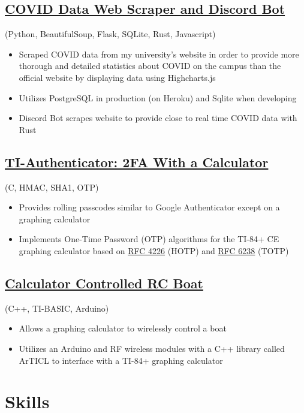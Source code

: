 \documentclass{article}
\begin{document}
\subsection{\href{https://github.com/jshin313/unofficial-temple-covid-live-dashboard}{COVID Data Web Scraper and Discord Bot}} (Python, BeautifulSoup, Flask, SQLite, Rust, Javascript)
\begin{itemize}
    \item Scraped COVID data from my university's website in order to provide more thorough and detailed statistics about COVID on the campus than the official website by displaying data using Highcharts.js
    \item Utilizes PostgreSQL in production (on Heroku) and Sqlite when developing
    \item Discord Bot scrapes website to provide close to real time COVID data with Rust
\end{itemize}

\subsection{\href{https://github.com/jshin313/ti-authenticator}{TI-Authenticator: 2FA With a Calculator}} (C, HMAC, SHA1, OTP)
\begin{itemize}
    \item Provides rolling passcodes similar to Google Authenticator except on a graphing calculator
    \item Implements One-Time Password (OTP) algorithms for the TI-84+ CE graphing calculator based on \href{https://tools.ietf.org/html/rfc4226}{RFC 4226} (HOTP) and \href{https://tools.ietf.org/html/rfc6238}{RFC 6238} (TOTP)
\end{itemize}

\subsection{\href{https://github.com/jshin313/CalcControlledBoat}{Calculator Controlled RC Boat}} (C++, TI-BASIC, Arduino)
\begin{itemize}
    \item Allows a graphing calculator to wirelessly control a boat
    \item Utilizes an Arduino and RF wireless modules with a C++ library called ArTICL to interface with a TI-84+ graphing calculator
\end{itemize}

\section{Skills}
\end{document}
